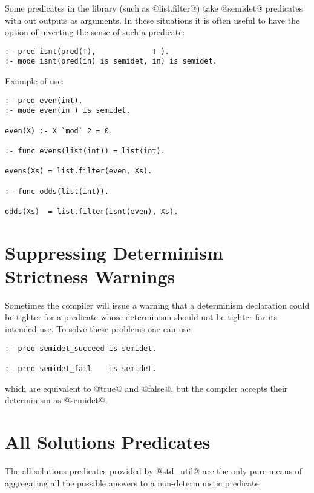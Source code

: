Some predicates in the library (such as @list.filter@) take
@semidet@ predicates with out outputs as arguments.  In these situations
it is often useful to have the option of inverting the sense of such a
predicate:
\begin{verbatim}
:- pred isnt(pred(T),             T ).
:- mode isnt(pred(in) is semidet, in) is semidet.
\end{verbatim}
Example of use:
\begin{verbatim}
:- pred even(int).
:- mode even(in ) is semidet.

even(X) :- X `mod` 2 = 0.

:- func evens(list(int)) = list(int).

evens(Xs) = list.filter(even, Xs).

:- func odds(list(int)).

odds(Xs)  = list.filter(isnt(even), Xs).
\end{verbatim}

\section{Suppressing Determinism Strictness Warnings}

Sometimes the compiler will issue a warning that a determinism
declaration could be tighter for a predicate whose determinism should
not be tighter for its intended use.  To solve these problems one can
use
\begin{verbatim}
:- pred semidet_succeed is semidet.

:- pred semidet_fail    is semidet.
\end{verbatim}
which are equivalent to @true@ and @false@, but the compiler accepts
their determinism as @semidet@.


\section{All Solutions Predicates}

The all-solutions predicates provided by @std_util@ are the only pure
means of aggregating all the possible answers to a non-deterministic
predicate.

